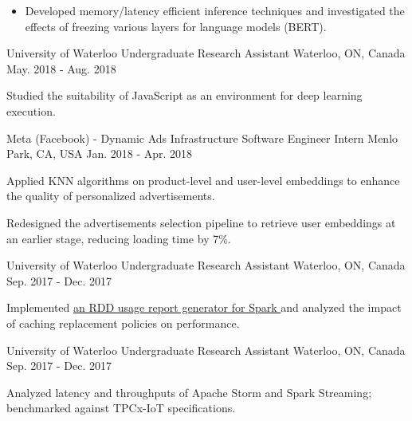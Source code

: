 \begin{cventries}
{\begin{cvitems}
\begin{itemize}[label=$\cdot$,leftmargin=0.7em]
\item {Developed memory/latency efficient inference techniques and investigated the effects of freezing various layers for language models (BERT).}
\end{itemize}
\end{cvitems}
}
\cventry
{University of Waterloo} %
{Undergraduate Research Assistant} %
{Waterloo, ON, Canada} %
{May. 2018 - Aug. 2018} %
{ %
\begin{cvitems}
\item {Studied the suitability of JavaScript as an environment for deep learning execution.}
\end{cvitems}
}
\cventry
{Meta (Facebook) - Dynamic Ads Infrastructure} %
{Software Engineer Intern} %
{Menlo Park, CA, USA} %
{Jan. 2018 - Apr. 2018} %
{ %
\begin{cvitems}
\item {Applied KNN algorithms on product-level and user-level embeddings to enhance the quality of personalized advertisements.}
\item {Redesigned the advertisements selection pipeline to retrieve user embeddings at an earlier stage, reducing loading time by 7\%.}
\end{cvitems}
}
\cventry
{University of Waterloo} %
{Undergraduate Research Assistant} %
{Waterloo, ON, Canada} %
{Sep. 2017 - Dec. 2017} %
{ %
\begin{cvitems}
\item {Implemented \href{https://github.com/ljj7975/CachedRDDReportGenerator}{an RDD usage report generator for Spark {\small \faGithub}} and analyzed the impact of caching replacement policies on performance.}
\end{cvitems}
}
\cventry
{University of Waterloo} %
{Undergraduate Research Assistant} %
{Waterloo, ON, Canada} %
{Sep. 2017 - Dec. 2017} %
{ %
\begin{cvitems}
\item {Analyzed latency and throughputs of Apache Storm and Spark Streaming; benchmarked against TPCx-IoT specifications.}
\end{cvitems}
}
\end{cventries}
